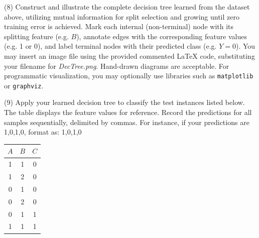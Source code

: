 \documentclass[11pt,addpoints,answers]{exam}
\begin{document}
\begin{questions}
		
		\item[(8)] Construct and illustrate the complete decision tree learned from the dataset above, utilizing mutual information for split selection and growing until zero training error is achieved. Mark each internal (non-terminal) node with its splitting feature (e.g. $B$), annotate edges with the corresponding feature values (e.g. 1 or 0), and label terminal nodes with their predicted class (e.g. $Y=0$). You may insert an image file using the provided commented \LaTeX{} code, substituting your filename for \textit{DecTree.png}. Hand-drawn diagrams are acceptable. For programmatic visualization, you may optionally use libraries such as \texttt{matplotlib} or \texttt{graphviz}.
		
		\begin{answer_box}[title=Decision Tree]
		\end{answer_box}
		
		
		\item[(9)] Apply your learned decision tree to classify the test instances listed below. The table displays the feature values for reference. Record the predictions for all samples sequentially, delimited by commas. For instance, if your predictions are 1,0,1,0, format as: 1,0,1,0
		
		\begin{center}
			\begin{tabular}{|c|c|c|}
				\hline
				$A$ & $B$ & $C$ \\ 
				\hline
				1 & 1 & 0 \\ 
				\hline
				1 & 2 & 0 \\ 
				\hline
				0 & 1 & 0 \\ 
				\hline
				0 & 2 & 0 \\ 
				\hline
				0 & 1 & 1 \\ 
				\hline
				1 & 1 & 1 \\ 
				\hline
			\end{tabular}
		\end{center}
		
		\begin{answer_box}[title=Predicted Labels]
		\end{answer_box}
		
	\end{questions}
	
\end{document}
